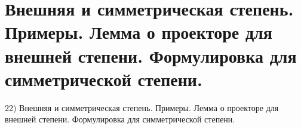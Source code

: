 \section{
 Внешняя и симметрическая степень. Примеры. Лемма о проекторе для внешней степени. Формулировка для симметрической степени.
}

22) Внешняя и симметрическая степень. Примеры. Лемма о проекторе для внешней степени. Формулировка для симметрической степени.
